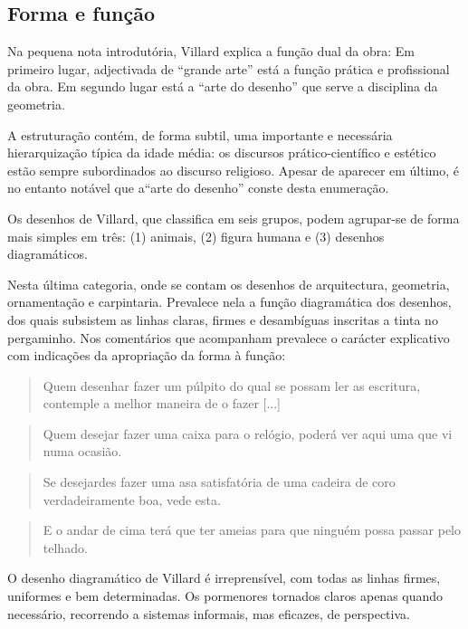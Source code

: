 \documentclass{article}
\begin{document}
\subsection{Forma e função}

Na pequena nota introdutória, Villard explica a função dual da obra:
Em primeiro lugar, adjectivada de ``grande arte'' está a função
prática e profissional da obra. Em segundo lugar está a ``arte do
desenho'' que serve a disciplina da geometria.

A estruturação contém, de forma subtil, uma importante e necessária
hierarquização típica da idade média: os discursos prático-científico
e estético estão sempre subordinados ao discurso religioso. Apesar de
aparecer em último, é no entanto notável que a``arte do desenho''
conste desta enumeração.

Os desenhos de Villard, que \cite{teresa} classifica em seis grupos,
podem agrupar-se de forma mais simples em três: (1) animais, (2)
figura humana e (3) desenhos diagramáticos.

Nesta última categoria, onde se contam os desenhos de arquitectura,
geometria, ornamentação e carpintaria. Prevalece nela a função
diagramática dos desenhos, dos quais subsistem as linhas claras,
firmes e desambíguas inscritas a tinta no pergaminho. Nos comentários
que acompanham prevalece o carácter explicativo com indicações da
apropriação da forma à função:

\begin{quote}
  Quem desenhar fazer um púlpito do qual se possam ler as escritura,
  contemple a melhor maneira de o fazer [...]  \cite[p. ??]{villard}
\end{quote}

\begin{quote}
  Quem desejar fazer uma caixa para o relógio, poderá ver aqui uma
  que vi numa ocasião. \cite[p. ??]{villard}
\end{quote}

\begin{quote} Se desejardes fazer uma asa satisfatória de uma cadeira
de coro verdadeiramente boa, vede esta. \cite[p. ??]{villard}
\end{quote}

\begin{quote} E o andar de cima terá que ter ameias para que ninguém
  possa passar pelo telhado. \cite[p. ??]{villard}
\end{quote}

O desenho diagramático de Villard é irreprensível, com todas as linhas
firmes, uniformes e bem determinadas. Os pormenores tornados claros
apenas quando necessário, recorrendo a sistemas informais, mas
eficazes, de perspectiva.
\end{document}
